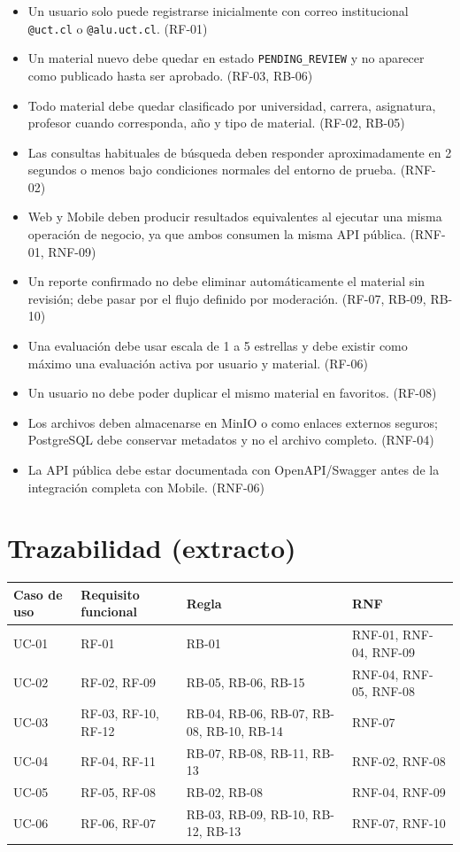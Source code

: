 \documentclass[12pt,a4paper]{article}
\begin{document}
\begin{itemize}
    \item Un usuario solo puede registrarse inicialmente con correo institucional \texttt{@uct.cl} o \texttt{@alu.uct.cl}. (RF-01)
    \item Un material nuevo debe quedar en estado \texttt{PENDING\_REVIEW} y no aparecer como publicado hasta ser aprobado. (RF-03, RB-06)
    \item Todo material debe quedar clasificado por universidad, carrera, asignatura, profesor cuando corresponda, año y tipo de material. (RF-02, RB-05)
    \item Las consultas habituales de búsqueda deben responder aproximadamente en 2 segundos o menos bajo condiciones normales del entorno de prueba. (RNF-02)
    \item Web y Mobile deben producir resultados equivalentes al ejecutar una misma operación de negocio, ya que ambos consumen la misma API pública. (RNF-01, RNF-09)
    \item Un reporte confirmado no debe eliminar automáticamente el material sin revisión; debe pasar por el flujo definido por moderación. (RF-07, RB-09, RB-10)
    \item Una evaluación debe usar escala de 1 a 5 estrellas y debe existir como máximo una evaluación activa por usuario y material. (RF-06)
    \item Un usuario no debe poder duplicar el mismo material en favoritos. (RF-08)
    \item Los archivos deben almacenarse en MinIO o como enlaces externos seguros; PostgreSQL debe conservar metadatos y no el archivo completo. (RNF-04)
    \item La API pública debe estar documentada con OpenAPI/Swagger antes de la integración completa con Mobile. (RNF-06)
\end{itemize}

\section{Trazabilidad (extracto)}

\begin{longtable}{p{} p{} p{} p{}}
\toprule
\textbf{Caso de uso} & \textbf{Requisito funcional} & \textbf{Regla} & \textbf{RNF}\\
\midrule
UC-01 & RF-01 & RB-01 & RNF-01, RNF-04, RNF-09\\
UC-02 & RF-02, RF-09 & RB-05, RB-06, RB-15 & RNF-04, RNF-05, RNF-08\\
UC-03 & RF-03, RF-10, RF-12 & RB-04, RB-06, RB-07, RB-08, RB-10, RB-14 & RNF-07\\
UC-04 & RF-04, RF-11 & RB-07, RB-08, RB-11, RB-13 & RNF-02, RNF-08\\
UC-05 & RF-05, RF-08 & RB-02, RB-08 & RNF-04, RNF-09\\
UC-06 & RF-06, RF-07 & RB-03, RB-09, RB-10, RB-12, RB-13 & RNF-07, RNF-10\\
\bottomrule
\end{longtable}
\end{document}
